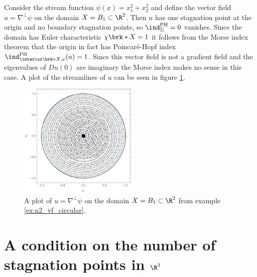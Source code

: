 \begin{example}\label{ex:n2_vf_circular}
  Consider the stream function $\psi(x)=x_1^2+x_2^2$ and define the vector field $u=\nabla^\perp\psi$ on the domain $X=B_1\subset\R^2$.
  Then $u$ has one stagnation point at the origin and no boundary stagnation points, so $\ind^\text{PH}_\Sigma=0$ vanishes.
  Since the domain has Euler characteristic $\chi\brk*{X}=1$ it follows from the Morse index theorem
  that the origin in fact has Poincaré-Hopf index $\ind^\text{PH}_{\interior\brk*{X},x}(u)=1$.
  Since this vector field is not a gradient field and the eigenvalues of $Du(0)$ are imaginary the Morse index makes no sense in
  this case.
  A plot of the streamlines of $u$ can be seen in figure \ref{pl:n2_vf_circular}.
  \begin{figure}
    \centering
    \includegraphics[width=0.5\textwidth]{../Plots/n2_vf_circular.pdf}
    \caption{A plot of $u=\nabla^\perp\psi$ on the domain $X=B_1\subset\R^2$ from example \ref{ex:n2_vf_circular}.}
    \label{pl:n2_vf_circular}
  \end{figure}
\end{example}

\section{A condition on the number of stagnation points in $\R^2$}

